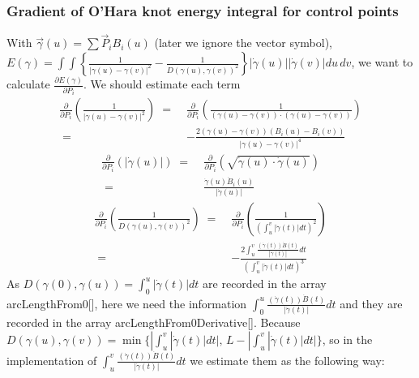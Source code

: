 \documentclass[12pt]{article}
\begin{document}
\subsubsection{Gradient of O'Hara knot energy integral for control points}


With $\vec{\gamma}(u) = \sum \vec{P}_i B_i(u)$ (later we ignore the vector symbol), $E(\gamma) = \int\int \left\{ \frac{1}{|\gamma(u)-\gamma(v)|^2} - \frac{1}{D(\gamma(u),\gamma(v))^2} \right\}|\dot{\gamma}(u)||\dot{\gamma}(v)| du\, dv$, we want to calculate $\frac{\partial E(\gamma)}{\partial P_i}$.
We should estimate each term
%
\begin{align*}
	\frac{\partial}{\partial P_i} \left( \frac{1}{|\gamma(u)-\gamma(v)|^2} \right) \;=\; & \frac{\partial}{\partial P_i} \left( \frac{1}{(\gamma(u)-\gamma(v))\cdot (\gamma(u)-\gamma(v))} \right) \\
	\;=\; & - \frac{2(\gamma(u)-\gamma(v))(B_i(u)-B_i(v))}{|\gamma(u)-\gamma(v)|^4}
\end{align*}
%
\begin{align*}
	\frac{\partial}{\partial P_i} \left( |\dot{\gamma}(u)| \right) \;=\; & \frac{\partial}{\partial P_i} \left( \sqrt{\dot{\gamma}(u)\cdot\dot{\gamma}(u)} \right) \\
	\;=\; & \frac{\dot{\gamma}(u)\dot{B}_i(u)}{|\dot{\gamma}(u)|}
\end{align*}
%
\begin{align*}
	\frac{\partial}{\partial P_i} \left( \frac{1}{D(\gamma(u),\gamma(v))^2} \right) \;=\; & \frac{\partial}{\partial P_i} \left( \frac{1}{(\int_u^v |\dot{\gamma}(t)|dt)^2} \right) \\
	\;=\; & - \frac{2\int_u^v\frac{(\dot{\gamma}(t))\dot{B}(t)}{|\dot{\gamma}(t)|}dt}{(\int_u^v |\dot{\gamma}(t)|dt)^3}
\end{align*}
%
As $D(\gamma (0),\gamma (u)) = \int_0^u |\dot{\gamma}(t)|dt$ are recorded in the array \textsf{arcLengthFrom0[]}, here we need the information $\int_0^u\frac{(\dot{\gamma}(t))\dot{B}(t)}{|\dot{\gamma}(t)|}dt$ and they are recorded in the array \textsf{arcLengthFrom0Derivative[]}.
Because $D(\gamma (u),\gamma (v)) = \min\{ |\int_u^v |\dot{\gamma}(t)|dt|,\, L - |\int_u^v |\dot{\gamma}(t)|dt| \}$, so in the implementation of $\int_u^v\frac{(\dot{\gamma}(t))\dot{B}(t)}{|\dot{\gamma}(t)|}dt$ we estimate them as the following way:
%
\end{document}

